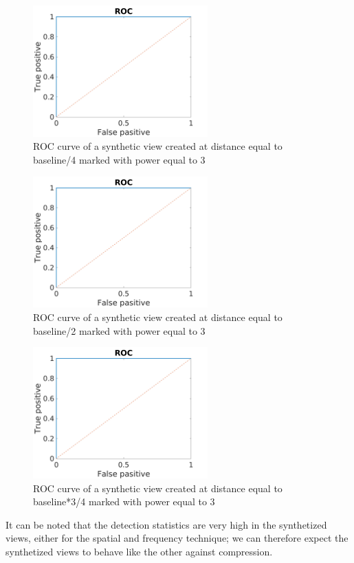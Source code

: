 \begin{figure}[h!]
\centering
\includegraphics[width=0.6\textwidth]{./img/ROC/ROC_gauss_synt_3_25.png}
\caption{\small{ROC curve of a synthetic view created at distance equal to baseline/4 marked with power equal to 3 }}
\label{fig:g3vs25}
\end{figure}
\begin{figure}[h!]
\centering
\includegraphics[width=0.6\textwidth]{./img/ROC/ROC_gauss_synt_3_50.png}
\caption{\small{ROC curve of a synthetic view created at distance equal to baseline/2 marked with power equal to 3 }}
\label{fig:g3vs50}
\end{figure}
\begin{figure}[h!]
\centering
\includegraphics[width=0.6\textwidth]{./img/ROC/ROC_gauss_synt_3_75.png}
\caption{\small{ROC curve of a synthetic view created at distance equal to baseline*3/4 marked with power equal to 3 }}
\label{fig:g3vs75}
\end{figure}
\clearpage
It can be noted that the detection statistics are very high in the synthetized views, either for the spatial and frequency technique; we can therefore expect the synthetized views to behave like the other against compression.\newline


